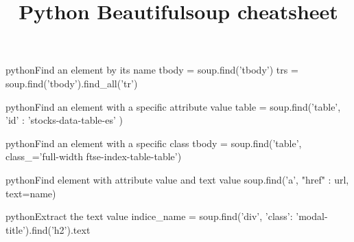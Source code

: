 \documentclass[10pt,a4paper]{article}
\title{\color{w3schools}Python Beautifulsoup cheatsheet
}
\begin{document}
\maketitle
\small
\begin{multicols}{3}

\thispagestyle{empty}
\scriptsize

% 




\begin{codebox}{python}{Find an element by its name}
tbody = soup.find('tbody')
trs = soup.find('tbody').find_all('tr')

\end{codebox}

\begin{codebox}{python}{Find an element with a specific attribute value}
table = soup.find('table', {'id' : 'stocks-data-table-es'} )

\end{codebox}

\begin{codebox}{python}{Find an element with a specific class}
tbody = soup.find('table', class_='full-width ftse-index-table-table')

\end{codebox}

\begin{codebox}{python}{Find element with attribute value and text value}
soup.find('a', {"href" : url}, text=name)

\end{codebox}

\begin{codebox}{python}{Extract the text value}
indice_name = soup.find('div', {'class': 'modal-title'}).find('h2').text


\end{codebox}
\end{multicols}
\end{document}
